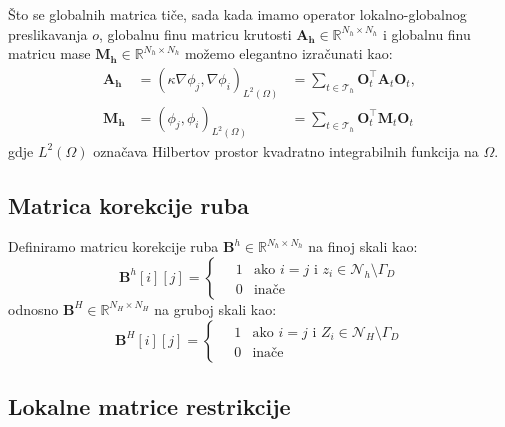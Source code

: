 \documentclass[zavrsnirad]{fer}
\begin{document}
Što se globalnih matrica tiče, sada kada imamo operator lokalno-globalnog preslikavanja $o$,
globalnu finu matricu krutosti $\mathbf{A_h} \in \mathbb{R}^{N_h \times N_h}$ i
globalnu finu matricu mase $\mathbf{M_h} \in \mathbb{R}^{N_h \times N_h}$ možemo elegantno izračunati kao:
\begin{align}
  \label{jed:global_stiffness_mass_matrix}
  \mathbf{A_h} &= {(\kappa \nabla \phi_j, \nabla \phi_i)}_{L^2(\Omega)} &= \sum_{t \in \mathcal{T}_h} \mathbf{O}_t^\top \mathbf{A}_t \mathbf{O}_t, \\
  \mathbf{M_h} &= {(\phi_j, \phi_i)}_{L^2(\Omega)} &= \sum_{t \in \mathcal{T}_h} \mathbf{O}_t^\top \mathbf{M}_t \mathbf{O}_t
\end{align}
gdje $L^2(\Omega)$ označava Hilbertov prostor kvadratno integrabilnih funkcija na $\Omega$.


\subsection{Matrica korekcije ruba}

Definiramo matricu korekcije ruba $\mathbf{B}^h \in \mathbb{R}^{N_h \times N_h}$ na finoj skali kao:
\begin{equation}
  \label{jed:boundary_correction_matrix_fine}
  \mathbf{B}^h[i][j] = \begin{cases}
    \quad 1 & \text{ako } i = j \text{ i } z_i \in \mathcal{N}_{h} \setminus \Gamma_D \\
    \quad 0 & \text{inače}
  \end{cases}
\end{equation}
odnosno $\mathbf{B}^H \in \mathbb{R}^{N_H \times N_H}$ na gruboj skali kao:
\begin{equation}
  \label{jed:boundary_correction_matrix_coarse}
  \mathbf{B}^H[i][j] = \begin{cases}
    \quad 1 & \text{ako } i = j \text{ i } Z_i \in \mathcal{N}_{H} \setminus \Gamma_D \\
    \quad 0 & \text{inače}
  \end{cases}
\end{equation}


\subsection{Lokalne matrice restrikcije}
\end{document}
